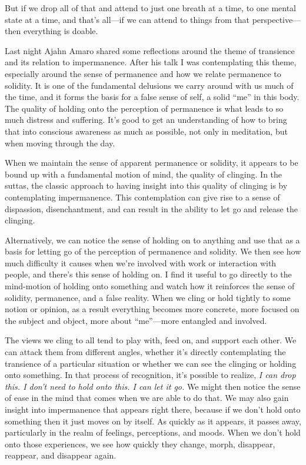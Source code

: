 But if we drop all of that and attend to just one breath at a time, to 
one mental state at a time, and that's all---if we can attend to things 
from that perspective---then everything is doable.


Last night Ajahn Amaro shared some reflections around the theme of 
transience and its relation to impermanence. After his talk I was 
contemplating this theme, especially around the sense of permanence and 
how we relate permanence to solidity. It is one of the fundamental 
delusions we carry around with us much of the time, and it forms the 
basis for a false sense of self, a solid ``me'' in this body. The 
quality of holding onto the perception of permanence is what leads to 
so much distress and suffering. It's good to get an understanding of 
how to bring that into conscious awareness as much as possible, not 
only in meditation, but when moving through the day.

When we maintain the sense of apparent permanence or solidity, it 
appears to be bound up with a fundamental motion of mind, the quality 
of clinging. In the suttas, the classic approach to having insight into 
this quality of clinging is by contemplating impermanence. This 
contemplation can give rise to a sense of dispassion, disenchantment, 
and can result in the ability to let go and release the clinging.

Alternatively, we can notice the sense of holding on to anything and 
use that as a basis for letting go of the perception of permanence and 
solidity. We then see how much difficulty it causes when we're involved 
with work or interaction with people, and there's this sense of holding 
on. I find it useful to go directly to the mind-motion of holding onto 
something and watch how it reinforces the sense of solidity, 
permanence, and a false reality. When we cling or hold tightly to some 
notion or opinion, as a result everything becomes more concrete, more 
focused on the subject and object, more about ``me''---more entangled 
and involved.

The views we cling to all tend to play with, feed on, and support each 
other. We can attack them from different angles, whether it's directly 
contemplating the transience of a particular situation or whether we 
can see the clinging or holding onto something. In that process of 
recognition, it's possible to realize, \emph{I can drop this. I don't 
need to hold onto this. I can let it go.} We might then notice the 
sense of ease in the mind that comes when we are able to do that. We 
may also gain insight into impermanence that appears right there, 
because if we don't hold onto something then it just moves on by 
itself. As quickly as it appears, it passes away, particularly in the 
realm of feelings, perceptions, and moods. When we don't hold onto 
those experiences, we see how quickly they change, morph, disappear, 
reappear, and disappear again.

